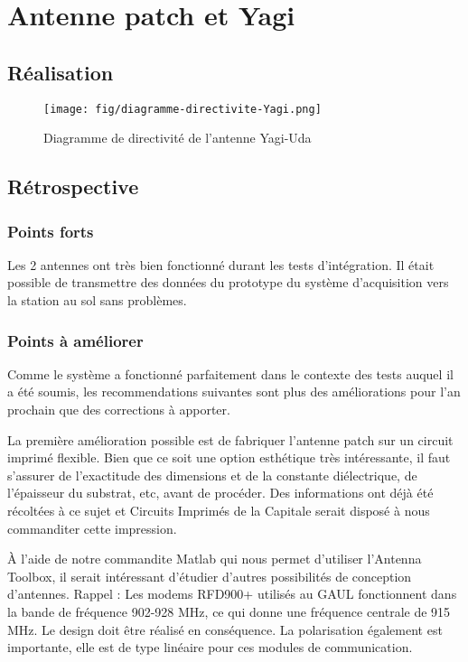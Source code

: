 \chapter{Antenne patch et Yagi}
\label{chap:antennes}

\section{Réalisation}


\begin{figure}[H]
	\center
	\texttt{[image: fig/diagramme-directivite-Yagi.png]}
	\caption{Diagramme de directivité de l'antenne Yagi-Uda}
	\label{f:diagramme_directivite_yagi}
\end{figure}

\section{Rétrospective}

\subsection{Points forts}

Les 2 antennes ont très bien fonctionné durant les tests d'intégration. Il
était possible de transmettre des données du prototype du système d'acquisition
vers la station au sol sans problèmes.

\subsection{Points à améliorer}

Comme le système a fonctionné parfaitement dans le contexte des tests auquel il
a été soumis, les recommendations suivantes sont plus des améliorations pour
l'an prochain que des corrections à apporter.
\par
La première amélioration possible est de fabriquer l'antenne patch sur un
circuit imprimé flexible. Bien que ce soit une option esthétique très
intéressante, il faut s'assurer de l'exactitude des dimensions et de la
constante diélectrique, de l'épaisseur du substrat, etc, avant de procéder. Des
informations ont déjà été récoltées à ce sujet et Circuits Imprimés de la
Capitale serait disposé à nous commanditer cette impression.
\par
À l'aide de notre commandite Matlab qui nous permet d'utiliser l'Antenna
Toolbox, il serait intéressant d'étudier d'autres possibilités de conception
d'antennes. Rappel : Les modems RFD900+ utilisés au GAUL fonctionnent dans la
bande de fréquence 902-928 MHz, ce qui donne une fréquence centrale de 915 MHz.
Le design doit être réalisé en conséquence. La polarisation également est
importante, elle est de type linéaire pour ces modules de communication. 

